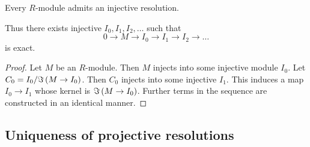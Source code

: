 \begin{proposition}
Every $ R $-module admits an injective resolution.
\end{proposition}

Thus there exists injective $ I_0, I_1, I_2, \dots $ such that
$$ 0 \to M \to I_0 \to I_1 \to I_2 \to \dots $$
is exact.

\begin{proof}
Let $ M $ be an $ R $-module. Then $ M $ injects into some injective module $ I_0 $. Let $ C_0 = I_0 / \Im \br{M \to I_0} $. Then $ C_0 $ injects into some injective $ I_1 $. This induces a map $ I_0 \to I_1 $ whose kernel is $ \Im \br{M \to I_0} $. Further terms in the sequence are constructed in an identical manner.
\end{proof}

\subsection{Uniqueness of projective resolutions}

